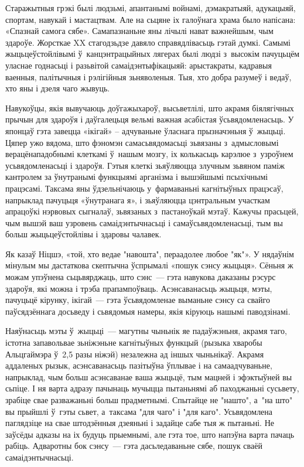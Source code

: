 Старажытныя грэкі былі людзьмі, апантанымі войнамі, дэмакратыяй, адукацыяй, спортам, навукай і мастацтвам. Але на сьцяне іх галоўнага храма было напісана: «Спазнай самога сябе». Самапазнаньне яны лічылі нават важнейшым, чым здароўе. Жорсткае XX стагодзьдзе давяло справядлівасьць гэтай думкі. Самымі жыцьцеўстойлівымі ў~канцэнтрацыйных лягерах былі людзі з~высокім пачуцьцём уласнае годнасьці і разьвітой самаідэнтыфікацыяй: арыстакраты, кадравыя ваенныя, палітычныя і рэлігійныя зьняволеныя. Тыя, хто добра разумеў і ведаў, хто яны і дзеля чаго жывуць.

Навукоўцы, якія вывучаюць доўгажыхароў, высьветлілі, што акрамя біялягічных прычын для здароўя і даўгалецьця вельмі важная асабістая ўсьвядомленасьць. У японцаў гэта завецца «ікігай» -- адчуваньне ўласнага прызначэньня ў~жыцьці. Цяпер ужо вядома, што фэномэн самасьвядомасьці зьвязаны з~адмысловымі верацёнападобнымі клеткамі ў~нашым мозгу, іх колькасьць карэлюе з~узроўнем усьвядомленасьці і здароўя. Гэтыя клеткі зьяўляюцца злучным зьвяном паміж кантролем за ўнутранымі функцыямі арганізма і вышэйшымі псыхічнымі працэсамі. Таксама яны ўдзельнічаюць у~фармаваньні кагнітыўных працэсаў, напрыклад пачуцьця «ўнутранага я», і зьяўляюцца цэнтральным участкам апрацоўкі нэрвовых сыгналаў, зьвязаных з~пастаноўкай мэтаў. Кажучы прасьцей, чым вышэй ваш узровень самаідэнтычнасьці і самаўсьвядомленасьці, тым вы больш жыцьцеўстойлівы і здаровы чалавек.

Як казаў Ніцшэ, «той, хто ведае "навошта", пераадолее любое "як"». У нядаўнім мінулым мы дастаткова скептычна ўспрымалі «пошук сэнсу жыцьця». Сёньня ж можам упэўнена сьцьвярджаць, што сэнс~--- гэта навукова даказаны рэсурс здароўя, які можна і трэба прапампоўваць. Асэнсаванасьць жыцьця, мэты, пачуцьцё кірунку, ікігай~--- гэта ўсьвядомленае выманьне сэнсу са свайго паўсядзённага досьведу і сьвядомыя намеры, якія кіруюць нашымі паводзінамі.

Наяўнасьць мэты ў~жыцьці~--- магутны чыньнік яе падаўжэньня, акрамя таго, істотна запавольвае зьніжэньне кагнітыўных функцый (рызыка хваробы Альцгаймэра ў~2,5 разы ніжэй) незалежна ад іншых чыньнікаў. Акрамя аддаленых рызык, асэнсаванасьць пазітыўна ўплывае і на самаадчуваньне, напрыклад, чым больш асэнсаванае ваша жыцьцё, тым мацней і эфэктыўней вы сьпіце. І ня варта адразу пачынаць мучыцца пытаньнямі аб паходжаньні сусьвету, зрабіце свае разважаньні больш прадметнымі. Спытайце не "нашто", а~"на што" вы прыйшлі ў~гэты сьвет, а~таксама "для чаго" і "для каго". Усьвядомлена паглядзіце на свае штодзённыя дзеяньні і задайце сабе тыя ж пытаньні. Не заўсёды адказы на іх будуць прыемнымі, але гэта тое, што напэўна варта пачаць рабіць. Адваротны бок сэнсу~--- гэта дасьледаваньне сябе, пошук сваёй самаідэнтычнасьці.

